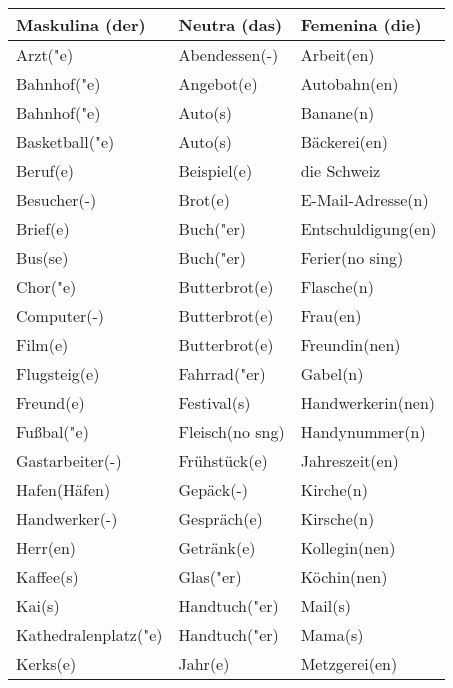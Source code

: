 \documentclass{article}
\renewcommand{\arraystretch}{1}
\begin{document}
\begin{table}[h!]
    \centering
    \label{tab:tabla1}
    \renewcommand{\arraystretch}{1.5}
    \begin{tabular}{|>{\raggedright\arraybackslash}p{5cm}|>{\raggedright\arraybackslash}p{5cm}|>{\raggedright\arraybackslash}p{5cm}|}
        \hline
        \rowcolor{gray!20} \textbf{Maskulina (der)} & \textbf{Neutra (das)} & \textbf{Femenina (die)} \\
        \hline
        Arzt("e) & Abendessen(-) & Arbeit(en) \\\hline
        Bahnhof("e) & Angebot(e) & Autobahn(en) \\\hline
        Bahnhof("e) & Auto(s) & Banane(n) \\\hline
        Basketball("e) & Auto(s) & Bäckerei(en) \\\hline
        Beruf(e) & Beispiel(e) & die Schweiz \\\hline
        Besucher(-) & Brot(e) & E-Mail-Adresse(n) \\\hline
        Brief(e) & Buch("er) & Entschuldigung(en) \\\hline
        Bus(se) & Buch("er) & Ferier(no sing) \\\hline
        Chor("e) & Butterbrot(e) & Flasche(n) \\\hline
        Computer(-) & Butterbrot(e) & Frau(en) \\\hline
        Film(e) & Butterbrot(e) & Freundin(nen) \\\hline
        Flugsteig(e) & Fahrrad("er) & Gabel(n) \\\hline
        Freund(e) & Festival(s) & Handwerkerin(nen) \\\hline
        Fu\ss{}bal("e) & Fleisch(no sng) & Handynummer(n) \\\hline
        Gastarbeiter(-) & Frühstück(e) & Jahreszeit(en) \\\hline
        Hafen(Häfen) & Gepäck(-) & Kirche(n) \\\hline
        Handwerker(-) & Gespräch(e) & Kirsche(n) \\\hline
        Herr(en) & Getränk(e) & Kollegin(nen) \\\hline
        Kaffee(s) & Glas("er) & Köchin(nen) \\\hline
        Kai(s) & Handtuch("er) & Mail(s) \\\hline
        Kathedralenplatz("e) & Handtuch("er) & Mama(s) \\\hline
        Kerks(e) & Jahr(e) & Metzgerei(en) \\\hline

\end{tabular}
\end{table}
\end{document}
